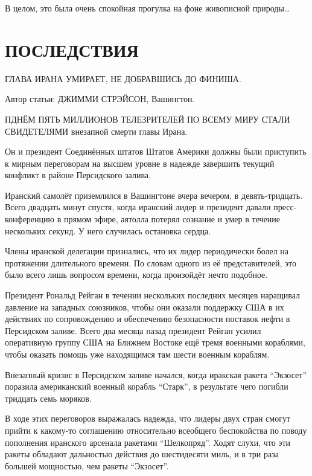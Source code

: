 \documentclass[a5paper, 9pt,
final, openany, twoside=true]{memoir}
\begin{document}
В целом, это была очень спокойная прогулка на фоне живописной природы…
\chapter{ПОСЛЕДСТВИЯ}
\begin{center}
ГЛАВА ИРАНА УМИРАЕТ, НЕ ДОБРАВШИСЬ ДО ФИНИША.\bigskip
\end{center}

\begin{center}
Автор статьи: ДЖИММИ СТРЭЙСОН, Вашингтон.\bigskip
\end{center}

П{ ДНЁМ ПЯТЬ МИЛЛИОНОВ ТЕЛЕЗРИТЕЛЕЙ ПО ВСЕМУ МИРУ СТАЛИ СВИДЕТЕЛЯМИ} внезапной смерти главы Ирана.

Он и президент Соединённых штатов Штатов Америки должны были приступить к мирным переговорам на высшем уровне в надежде завершить текущий конфликт в районе Персидского залива.\bigskip

Иранский самолёт приземлился в Вашингтоне вчера вечером, в девять-тридцать. Всего двадцать минут спустя, когда иранский лидер и президент давали пресс-конференцию в прямом эфире, аятолла потерял сознание и умер в течение нескольких секунд. У него случилась остановка сердца.\bigskip

Члены иранской делегации признались, что их лидер периодически болел на протяжении длительного времени. По словам одного из её представителей, это было всего лишь вопросом времени, когда произойдёт нечто подобное.\bigskip

Президент Рональд Рейган в течении нескольких последних месяцев наращивал давление на западных союзников, чтобы они оказали поддержку США в их действиях по сопровождению и обеспечению безопасности поставок нефти в Персидском заливе. Всего два месяца назад президент Рейган усилил оперативную группу США на Ближнем Востоке ещё тремя военными кораблями, чтобы оказать помощь уже находящимся там шести военным кораблям.\bigskip

Внезапный кризис в Персидском заливе начался, когда иракская ракета ``Экзосет'' поразила американский военный корабль ``Старк'', в результате чего погибли тридцать семь моряков.\bigskip

В ходе этих переговоров выражалась надежда, что лидеры двух стран смогут прийти к какому-то соглашению относительно всеобщего беспокойства по поводу пополнения иранского арсенала ракетами ``Шелкопряд''. Ходят слухи, что эти ракеты обладают дальностью действия до шестидесяти миль, и в три раза большей мощностью, чем ракеты ``Экзосет''.\bigskip
\end{document}
